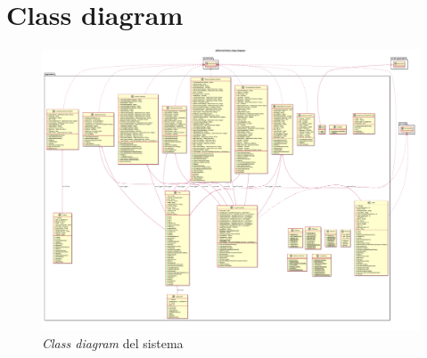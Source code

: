 \documentclass[a4paper,12pt,titlepage]{article}
\begin{document}
{{{\section{Class diagram}\label{sec:calssdiagram}
\begin{figure}[H]
		\centering
		\includegraphics[scale=0.13, angle=90]{classDiagram}
		\caption{\textit{Class diagram} del sistema}
\end{figure}
\begin{figure}[H]
		\centering

\end{figure}}}}
\end{document}
